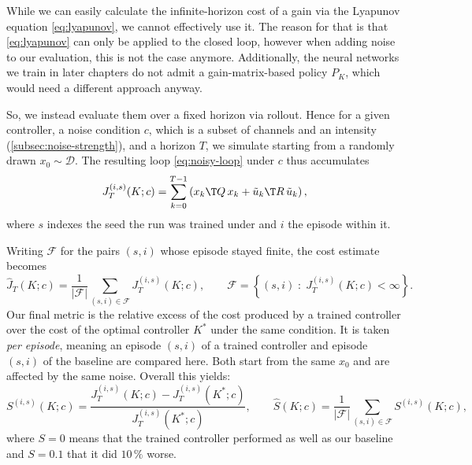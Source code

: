 While we can easily calculate the infinite-horizon cost of a gain
via the Lyapunov equation \eqref{eq:lyapunov}, we cannot effectively
use it. The reason for that is that \eqref{eq:lyapunov} can only
be applied to the closed loop, however when adding noise to our
evaluation, this is not the case anymore. Additionally, the neural
networks we train in later chapters do not admit a gain-matrix-based
policy $P_K$, which would need a different approach anyway.

So, we instead evaluate them over a fixed horizon via rollout. Hence for
a given controller, a noise condition $c$, which is a subset of channels and an
intensity (\cref{subsec:noise-strength}), and a horizon $T$, we
simulate starting from a randomly drawn $x_0 \sim \mathcal{D}$.
The resulting loop \eqref{eq:noisy-loop} under $c$ thus accumulates
\begin{equation}
    \label{eq:empirical-return}
    J_T^{(i,s)}(K; c)
    = \sum_{k=0}^{T-1}
      \left( x_k\T Q\, x_k + \tilde{u}_k\T R\, \tilde{u}_k \right) ,
\end{equation}
where $s$ indexes the seed the run was trained under and $i$ the episode
within it.

Writing $\mathcal{F}$ for the pairs $(s,i)$ whose episode stayed finite,
the cost estimate becomes
\begin{equation}
    \label{eq:empirical-cost}
    \hat{J}_T(K; c)
    = \frac{1}{\lvert \mathcal{F} \rvert}
      \sum_{(s,i) \in \mathcal{F}} J^{(i,s)}_T(K; c) ,
    \qquad
    \mathcal{F} = \left\{ (s,i) \;:\; J^{(i,s)}_T(K; c) < \infty \right\} .
\end{equation}
Our final metric is the relative excess of the cost produced by a
trained controller over the cost of the optimal controller $K^{*}$
under the same condition. It is taken \emph{per episode}, meaning
an episode $(s,i)$ of a trained controller and episode $(s,i)$ of the baseline
are compared here. Both start from the same $x_0$ and are affected by 
the same noise. Overall this yields:
\begin{equation}
    \label{eq:suboptimality}
    S^{(i,s)}(K; c)
        = \frac{J^{(i,s)}_T(K; c) - J^{(i,s)}_T(K^{*}; c)}
                {J^{(i,s)}_T(K^{*}; c)} ,
    \qquad
    \hat{S}(K; c)
        = \frac{1}{\lvert \mathcal{F} \rvert}
          \sum_{(s,i) \in \mathcal{F}} S^{(i,s)}(K; c) ,
\end{equation}
where $S = 0$ means that the trained controller performed as well
as our baseline and $S = 0.1$ that it did $10\,\%$ worse.

